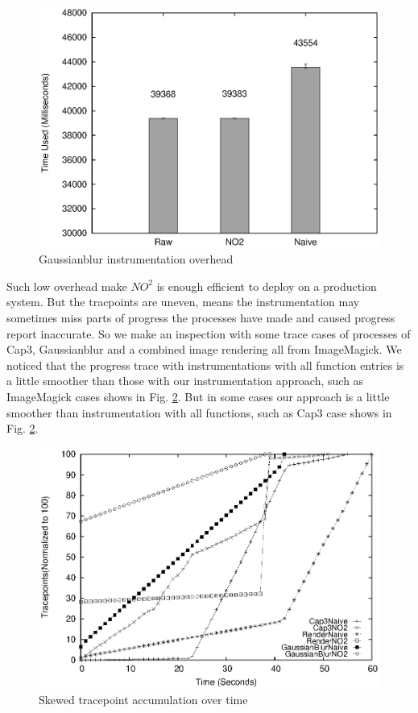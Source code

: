 \begin{figure}
\centering
  \includegraphics[width=0.9\columnwidth]{figures/overhead_gaussianblur.eps}
\caption{Gaussianblur instrumentation overhead}
\label{figure:overhead_gaussianblur}
\end{figure}

Such low overhead make $NO^2$ is enough efficient to deploy on a production system. But the tracpoints are uneven, means the instrumentation may sometimes miss parts of progress the processes have made and caused progress report inaccurate. So we make an inspection with some trace cases of processes of Cap3, Gaussianblur and a combined image rendering all from ImageMagick. We noticed that the progress trace with instrumentations with all function entries is a little smoother than those with our instrumentation approach, such as ImageMagick cases shows in Fig. \ref{figure:tracepoints}. But in some cases our approach is a little smoother than instrumentation with all functions, such as Cap3 case shows in Fig. \ref{figure:tracepoints}.

\begin{figure}
\centering
\includegraphics[width=0.9\columnwidth]{figures/tracepoints_all_vs_sampling.eps}
\caption{Skewed tracepoint accumulation over time}
\label{figure:tracepoints}
\end{figure}

